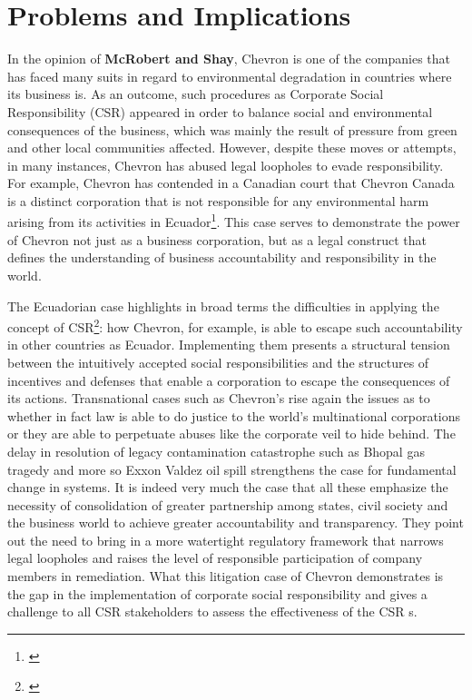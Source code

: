 \documentclass[12pt,letterpaper]{article}
\begin{document}
\section{Problems and Implications}
    In the opinion of \textbf{McRobert and Shay}, Chevron is one of the companies that has faced many suits in regard to environmental degradation in countries where its business is. As an outcome, such procedures as Corporate Social Responsibility (CSR) appeared in order to balance social and environmental consequences of the business, which was mainly the result of pressure from green and other local communities affected. However, despite these moves or attempts, in many instances, Chevron has abused legal loopholes to evade responsibility. For example, Chevron has contended in a Canadian court that Chevron Canada is a distinct corporation that is not responsible for any environmental harm arising from its activities in Ecuador\footnote{\citeauthor{David}}. This case serves to demonstrate the power of Chevron not just as a business corporation, but as a legal construct that defines the understanding of business accountability and responsibility in the world.

    The Ecuadorian case highlights in broad terms the difficulties in applying the concept of CSR\footnote{\citeauthor{Cass}}: how Chevron, for example, is able to escape such accountability in other countries as Ecuador. Implementing them presents a structural tension between the intuitively accepted social responsibilities and the structures of incentives and defenses that enable a corporation to escape the consequences of its actions. Transnational cases such as Chevron’s rise again the issues as to whether in fact law is able to do justice to the world’s multinational corporations or they are able to perpetuate abuses like the corporate veil to hide behind. The delay in resolution of legacy contamination catastrophe such as Bhopal gas tragedy and more so Exxon Valdez oil spill strengthens the case for fundamental change in systems. It is indeed very much the case that all these emphasize the necessity of consolidation of greater partnership among states, civil society and the business world to achieve greater accountability and transparency. They point out the need to bring in a more watertight regulatory framework that narrows legal loopholes and raises the level of responsible participation of company members in remediation. What this litigation case of Chevron demonstrates is the gap in the implementation of corporate social responsibility and gives a challenge to all CSR stakeholders to assess the effectiveness of the CSR s.
\end{document}
